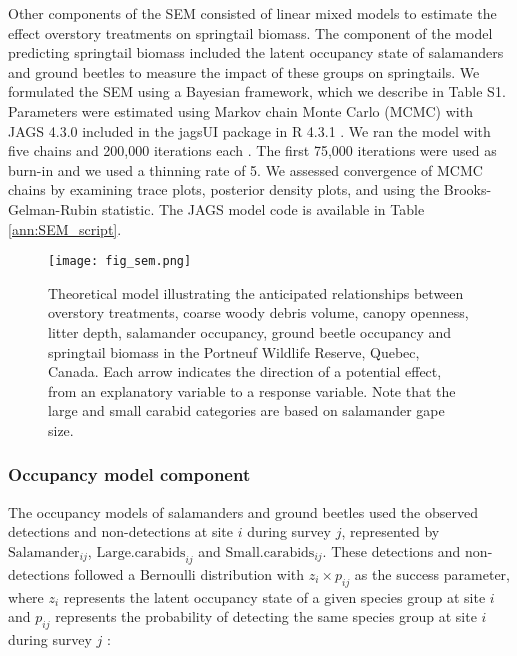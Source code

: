 Other components of the SEM consisted of linear mixed models to estimate the effect overstory treatments on springtail biomass. 
The component of the model predicting springtail biomass included the latent occupancy state of salamanders and ground beetles to measure the impact of these groups on springtails. 
We formulated the SEM using a Bayesian framework, which we describe in Table S1. 
Parameters were estimated using Markov chain Monte Carlo (MCMC) with JAGS 4.3.0 included in the jagsUI package in R 4.3.1 \citep{lunnBUGSProjectEvolution2009,rcoreteamLanguageEnvironmentStatistical2020,kellnerJagsUIWrapperRjags2024}. 
We ran the model with five chains and 200,000 iterations each \citep{gelmanUnderstandingPredictiveInformation2014}. 
The first 75,000 iterations were used as burn-in and we used a thinning rate of 5. 
We assessed convergence of MCMC chains by examining trace plots, posterior density plots, and using the Brooks-Gelman-Rubin statistic. 
The JAGS model code is available in Table \ref{ann:SEM_script}.


\begin{figure}[ht!]
	\centering
	\texttt{[image: fig\_sem.png]}
	\caption[Theoretical model illustrating the anticipated relationships between overstory treatments, environmental variables and species groups.]
  {Theoretical model illustrating the anticipated relationships between overstory treatments, coarse woody debris volume, canopy openness, litter depth,
   salamander occupancy, ground beetle occupancy and springtail biomass in the Portneuf Wildlife Reserve, Quebec, Canada. 
   Each arrow indicates the direction of a potential effect, from an explanatory variable to a response variable. 
   Note that the large and small carabid categories are based on salamander gape size.}
	\label{fig:SEM}
\end{figure} 

\subsubsection{Occupancy model component} 


The occupancy models of salamanders and ground beetles used the observed detections and non-detections at site $i$ during survey $j$, 
represented by $\text{Salamander}_{ij}$, $\text{Large.carabids}_{ij}$ and $\text{Small.carabids}_{ij}$. These detections and non-detections followed a Bernoulli distribution with $z_{i} \times p_{ij}$ as the success parameter, 
where $z_{i}$ represents the latent occupancy state of a given species group at site $i$ and $p_{ij}$ represents the probability of detecting the same species group at site $i$ during survey $j$ :


